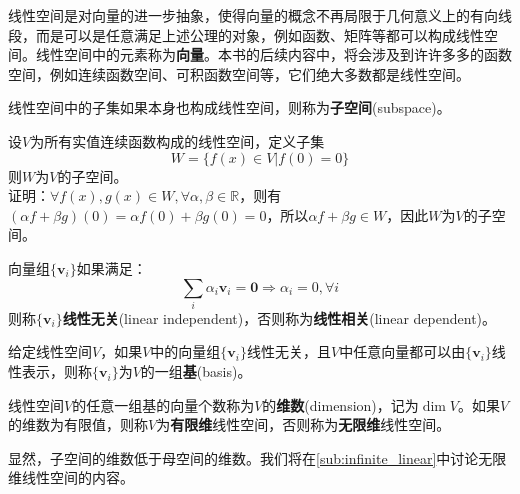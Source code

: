 线性空间是对向量的进一步抽象，使得向量的概念不再局限于几何意义上的有向线段，而是可以是任意满足上述公理的对象，例如函数、矩阵等都可以构成线性空间。线性空间中的元素称为\textbf{向量}。本书的后续内容中，将会涉及到许许多多的函数空间，例如连续函数空间、可积函数空间等，它们绝大多数都是线性空间。

\begin{definition}[子空间]
    线性空间中的子集如果本身也构成线性空间，则称为\textbf{子空间}(subspace)。
\end{definition}

\begin{example}
    设$V$为所有实值连续函数构成的线性空间，定义子集
    $$W=\{f(x)\in V|f(0)=0\}$$
    则$W$为$V$的子空间。\\
    证明：$\forall f(x),g(x)\in W,\forall \alpha,\beta\in \mathbb{R}$，则有$(\alpha f+\beta g)(0)=\alpha f(0)+\beta g(0)=0$，所以$\alpha f+\beta g\in W$，因此$W$为$V$的子空间。
\end{example}

\begin{definition}[线性无关]
    向量组$\{\mathbf{v}_i\}$如果满足：
    $$\sum_i \alpha_i \mathbf{v}_i=\mathbf{0}\Rightarrow \alpha_i=0,\forall i$$
    则称$\{\mathbf{v}_i\}$\textbf{线性无关}(linear independent)，否则称为\textbf{线性相关}(linear dependent)。
\end{definition}

\begin{definition}[基]
    给定线性空间$V$，如果$V$中的向量组$\{\mathbf{v}_i\}$线性无关，且$V$中任意向量都可以由$\{\mathbf{v}_i\}$线性表示，则称$\{\mathbf{v}_i\}$为$V$的一组\textbf{基}(basis)。
\end{definition}


\begin{definition}[维数]
    线性空间$V$的任意一组基的向量个数称为$V$的\textbf{维数}(dimension)，记为$\dim V$。如果$V$的维数为有限值，则称$V$为\textbf{有限维}线性空间，否则称为\textbf{无限维}线性空间。
\end{definition}

显然，子空间的维数低于母空间的维数。我们将在\ref{sub:infinite_linear}中讨论无限维线性空间的内容。

